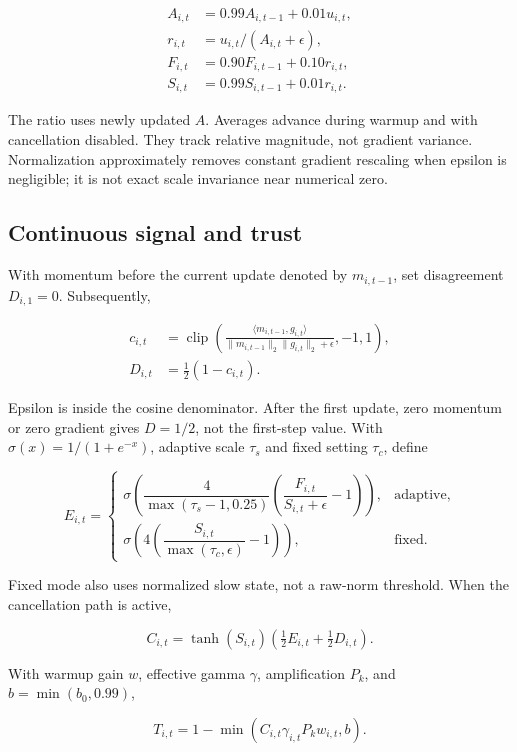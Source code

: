 \documentclass[11pt,a4paper]{article}
\begin{document}
\[
\begin{aligned}
A_{i,t}&=0.99A_{i,t-1}+0.01u_{i,t},\\
r_{i,t}&=u_{i,t}/(A_{i,t}+\epsilon),\\
F_{i,t}&=0.90F_{i,t-1}+0.10r_{i,t},\\
S_{i,t}&=0.99S_{i,t-1}+0.01r_{i,t}.
\end{aligned}
\]

The ratio uses newly updated $A$. Averages advance during warmup and with cancellation disabled. They track relative magnitude, not gradient variance. Normalization approximately removes constant gradient rescaling when epsilon is negligible; it is not exact scale invariance near numerical zero.

\subsection{Continuous signal and trust}

With momentum before the current update denoted by $m_{i,t-1}$, set disagreement $D_{i,1}=0$. Subsequently,

\[
\begin{aligned}
c_{i,t}&=\operatorname{clip}\left(\frac{\langle m_{i,t-1},g_{i,t}\rangle}{\|m_{i,t-1}\|_2\|g_{i,t}\|_2+\epsilon},-1,1\right),\\
D_{i,t}&=\tfrac12(1-c_{i,t}).
\end{aligned}
\]

Epsilon is inside the cosine denominator. After the first update, zero momentum or zero gradient gives $D=1/2$, not the first-step value. With $\sigma(x)=1/(1+e^{-x})$, adaptive scale $\tau_s$ and fixed setting $\tau_c$, define

\[
E_{i,t}=\begin{cases}
\sigma\left(\dfrac{4}{\max(\tau_s-1,0.25)}\left(\dfrac{F_{i,t}}{S_{i,t}+\epsilon}-1\right)\right),&\text{adaptive},\\
\sigma\left(4\left(\dfrac{S_{i,t}}{\max(\tau_c,\epsilon)}-1\right)\right),&\text{fixed}.
\end{cases}
\]

Fixed mode also uses normalized slow state, not a raw-norm threshold. When the cancellation path is active,

\[
C_{i,t}=\tanh(S_{i,t})\left(\tfrac12 E_{i,t}+\tfrac12 D_{i,t}\right).
\]

With warmup gain $w$, effective gamma $\gamma$, amplification $P_k$, and $b=\min(b_0,0.99)$,

\[
T_{i,t}=1-\min(C_{i,t}\gamma_{i,t}P_k w_{i,t},b).
\]
\end{document}
